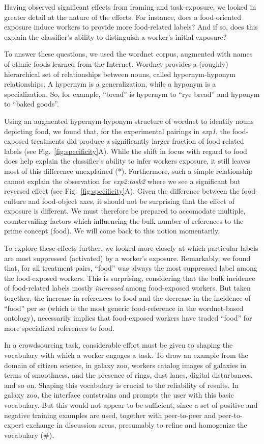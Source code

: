 \documentclass[12pt]{article}
\begin{document}
Having observed significant effects from framing and task-exposure,
we looked in greater detail at the nature of the effects.  For instance,
does a food-oriented exposure induce workers to provide more food-related
labels?  And if so, does this explain the classifier's ability to distinguish
a worker's initial exposure? 

To answer these questions, we used the wordnet corpus, augmented with names of
ethnic foods learned from the Internet.  Wordnet provides a (roughly)
hierarchical set of relationships between nouns, called hypernym-hyponym
relationships.  A hypernym is a generalization, while a hyponym is a 
specialization.  So, for example, ``bread'' is hypernym to ``rye bread'' 
and hyponym to ``baked goods''.

Using an augmented hypernym-hyponym structure of wordnet to identify nouns 
depicting food, we found that, for the experimental pairings in 
\textit{exp1}, the
food-exposed treatments did produce a significantly larger fraction of 
food-related labels (see Fig.~\ref{fig:specificity}A).  While the shift in 
focus with regard to food does help explain the classifier's ability to 
infer workers exposure, it still leaves most of this difference unexplained 
(*).
Furthermore, such a simple relationship cannot explain the observation for
\textit{exp2:task2} where we see a significant but reversed effect
(see Fig.~\ref{fig:specificity}A).
Given the difference between the food-culture and food-object axes, it should
not be surprising that the effect of exposure is different.  We must therefore
be prepared to accomodate multiple, countervailing factors which influencing 
the bulk number of references to the prime concept (food).  We will come back 
to this notion momentarily.

To explore these effects further, we looked more closely at which particular
labels are most suppressed (activated) by a worker's exposure.  Remarkably,
we found that, for all treatment pairs, ``food'' was always the most 
suppressed label among 
the food-exposed workers.  This is surprising, considering 
that the bulk incidence of food-related labels mostly \textit{increased} among 
food-exposed workers.  But taken together, the increase in references to food 
and the decrease in the incidence of ``food'' per se (which is the most generic
food-reference in the wordnet-based ontology), necessarily implies that
food-exposed workers have traded ``food'' for more specialized references to 
food. 

In a crowdsourcing task, considerable effort must be given to shaping the 
vocabulary with which a worker engages a task.  To draw an example from the 
domain of citizen science, in galaxy zoo, workers catalog images of galaxies 
in terms of smoothness, and the presence of rings, dust lanes, digital 
disturbances, and so on.  Shaping this vocabulary is crucial to the reliability
of results.  In galaxy zoo, the interface contstrains and prompts the user
with this basic vocabulary.  But this would not appear to be sufficient, since
a set of positive and negative training examples are used, together with
peer-to-peer and peer-to-expert exchange in discussion areas, presumably to
refine and homogenize the vocabulary (\#).  
\end{document}

